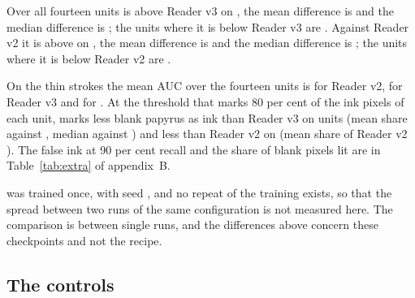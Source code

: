 Over all fourteen units \MtName{} is above Reader v3 on \MtAllKTextThree{}, the mean difference is \MtAllMeanDiffThreeAuc{} and the median difference is \MtAllMedianDiffThreeAuc{}; the units where it is below Reader v3 are \MtBelowListAllThree{}. Against Reader v2 it is above on \MtAllKTextTwo{}, the mean difference is \MtAllMeanDiffTwoAuc{} and the median difference is \MtAllMedianDiffTwoAuc{}; the units where it is below Reader v2 are \MtBelowListAllTwo{}.

On the thin strokes the mean AUC over the fourteen units is \MtAllMeanRTwoThin{} for Reader v2, \MtAllMeanRThreeThin{} for Reader v3 and \MtAllMeanOwnThin{} for \MtName{}. At the threshold that marks 80 per cent of the ink pixels of each unit, \MtName{} marks less blank papyrus as ink than Reader v3 on \MtAllFaLessThree{} units (mean share \MtAllMeanOwnFaEighty{} against \MtAllMeanRThreeFaEighty{}, median \MtAllMedianOwnFaEighty{} against \MtAllMedianRThreeFaEighty{}) and less than Reader v2 on \MtAllFaLessTwo{} (mean share of Reader v2 \MtAllMeanRTwoFaEighty{}). The false ink at 90 per cent recall and the share of blank pixels lit are in Table~\ref{tab:extra} of appendix~B.

\MtName{} was trained once, with seed \Seed{}, and no repeat of the training exists, so that the spread between two runs of the same configuration is not measured here. The comparison is between single runs, and the differences above concern these checkpoints and not the recipe.

\subsection{The controls}\label{sec:controls-Mt}

